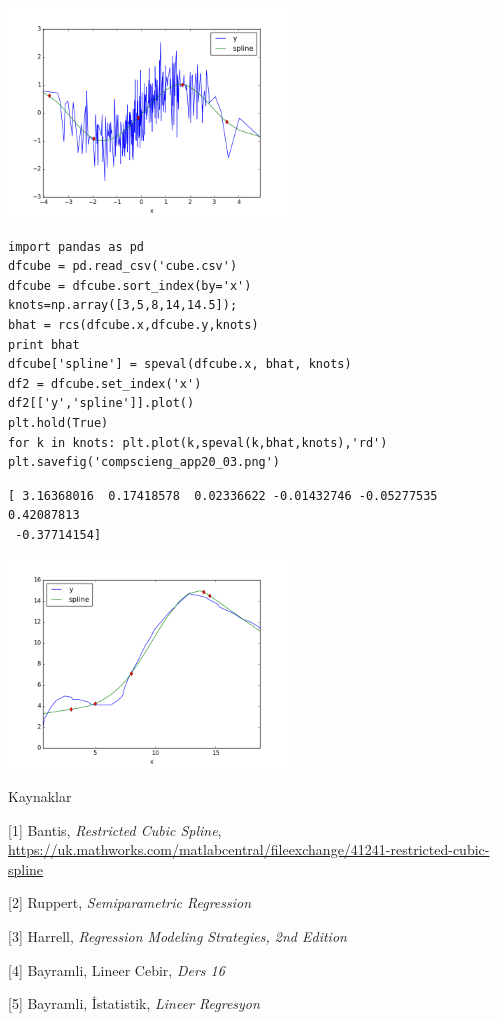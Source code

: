 \documentclass[12pt,fleqn]{article}\usepackage{../../common}
\begin{document}
\includegraphics[width=20em]{compscieng_app20_01.png}

\begin{verbatim}
import pandas as pd
dfcube = pd.read_csv('cube.csv')
dfcube = dfcube.sort_index(by='x')
knots=np.array([3,5,8,14,14.5]);
bhat = rcs(dfcube.x,dfcube.y,knots)
print bhat
dfcube['spline'] = speval(dfcube.x, bhat, knots)
df2 = dfcube.set_index('x')
df2[['y','spline']].plot()
plt.hold(True)
for k in knots: plt.plot(k,speval(k,bhat,knots),'rd')
plt.savefig('compscieng_app20_03.png')
\end{verbatim}

\begin{verbatim}
[ 3.16368016  0.17418578  0.02336622 -0.01432746 -0.05277535  0.42087813
 -0.37714154]
\end{verbatim}

\includegraphics[width=20em]{compscieng_app20_03.png}


Kaynaklar

[1] Bantis, {\em Restricted Cubic Spline}, \url{https://uk.mathworks.com/matlabcentral/fileexchange/41241-restricted-cubic-spline}

[2] Ruppert, {\em Semiparametric Regression}

[3] Harrell, {\em Regression Modeling Strategies, 2nd Edition}

[4] Bayramli, Lineer Cebir, {\em Ders 16}

[5] Bayramli, İstatistik, {\em Lineer Regresyon}
\end{document}
